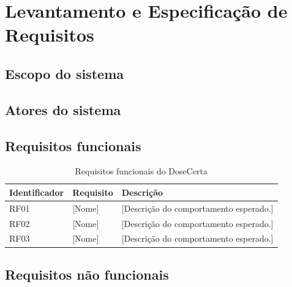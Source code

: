 
\chapter{Levantamento e Especificação de Requisitos}
\label{chap:requisitos}


\section{Escopo do sistema}
\label{sec:escopo}


\section{Atores do sistema}
\label{sec:atores}


\section{Requisitos funcionais}
\label{sec:requisitos_funcionais}


\begin{table}[htbp]
    \centering
    \caption{Requisitos funcionais do DoseCerta}
    \label{tab:requisitos_funcionais}
    \begin{tabular}{|p{2cm}|p{3cm}|p{8cm}|}
        \hline
        \textbf{Identificador} &
        \textbf{Requisito} &
        \textbf{Descrição} \\
        \hline
        RF01 & [Nome] & [Descrição do comportamento esperado.] \\
        \hline
        RF02 & [Nome] & [Descrição do comportamento esperado.] \\
        \hline
        RF03 & [Nome] & [Descrição do comportamento esperado.] \\
        \hline
    \end{tabular}
\end{table}

\section{Requisitos não funcionais}
\label{sec:requisitos_nao_funcionais}

